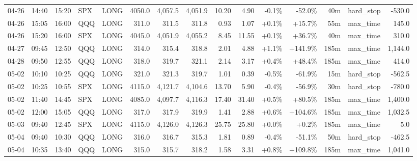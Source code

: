 \documentclass[11pt,a4paper,twoside]{article}
\begin{document}
\begin{landscape}
\begin{center}
\begin{longtable}{>{\color{txtmain}}l l l l l r r r r r r r r >{\color{txtmain}}l r}
04-26 & 14:40 & 15:20 & SPX & LONG & 4050.0 & 4,057.5 & 4,051.9 & 10.20 & 4.90 & \textcolor{lossred}{-0.1\%} & \textcolor{lossred}{-52.0\%} & 40m & hard\_stop & \textcolor{lossred}{-530.0} \\
04-26 & 15:05 & 16:00 & QQQ & LONG & 311.0 & 311.5 & 311.8 & 0.93 & 1.07 & \textcolor{wingreen}{+0.1\%} & \textcolor{wingreen}{+15.7\%} & 55m & max\_time & \textcolor{wingreen}{145.0} \\
04-26 & 15:20 & 16:00 & SPX & LONG & 4045.0 & 4,051.9 & 4,055.2 & 8.45 & 11.55 & \textcolor{wingreen}{+0.1\%} & \textcolor{wingreen}{+36.7\%} & 40m & max\_time & \textcolor{wingreen}{310.0} \\
04-27 & 09:45 & 12:50 & QQQ & LONG & 314.0 & 315.4 & 318.8 & 2.01 & 4.88 & \textcolor{wingreen}{+1.1\%} & \textcolor{wingreen}{+141.9\%} & 185m & max\_time & \textcolor{wingreen}{1,144.0} \\
04-28 & 09:50 & 12:55 & QQQ & LONG & 318.0 & 319.7 & 321.1 & 2.14 & 3.17 & \textcolor{wingreen}{+0.4\%} & \textcolor{wingreen}{+48.4\%} & 185m & max\_time & \textcolor{wingreen}{414.0} \\
05-02 & 10:10 & 10:25 & QQQ & LONG & 321.0 & 321.3 & 319.7 & 1.01 & 0.39 & \textcolor{lossred}{-0.5\%} & \textcolor{lossred}{-61.9\%} & 15m & hard\_stop & \textcolor{lossred}{-562.5} \\
05-02 & 10:25 & 10:55 & SPX & LONG & 4115.0 & 4,121.7 & 4,104.6 & 13.70 & 5.90 & \textcolor{lossred}{-0.4\%} & \textcolor{lossred}{-56.9\%} & 30m & hard\_stop & \textcolor{lossred}{-780.0} \\
05-02 & 11:40 & 14:45 & SPX & LONG & 4085.0 & 4,097.7 & 4,116.3 & 17.40 & 31.40 & \textcolor{wingreen}{+0.5\%} & \textcolor{wingreen}{+80.5\%} & 185m & max\_time & \textcolor{wingreen}{1,400.0} \\
05-02 & 12:00 & 15:05 & QQQ & LONG & 317.0 & 317.9 & 319.9 & 1.41 & 2.88 & \textcolor{wingreen}{+0.6\%} & \textcolor{wingreen}{+104.6\%} & 185m & max\_time & \textcolor{wingreen}{1,032.5} \\
05-03 & 09:40 & 12:45 & SPX & LONG & 4115.0 & 4,126.0 & 4,126.3 & 25.75 & 25.80 & \textcolor{wingreen}{+0.0\%} & \textcolor{wingreen}{+0.2\%} & 185m & max\_time & \textcolor{wingreen}{5.0} \\
05-04 & 09:40 & 10:30 & QQQ & LONG & 316.0 & 316.7 & 315.3 & 1.81 & 0.89 & \textcolor{lossred}{-0.4\%} & \textcolor{lossred}{-51.1\%} & 50m & hard\_stop & \textcolor{lossred}{-462.5} \\
05-04 & 10:35 & 13:40 & QQQ & LONG & 315.0 & 315.7 & 318.2 & 1.58 & 3.31 & \textcolor{wingreen}{+0.8\%} & \textcolor{wingreen}{+109.8\%} & 185m & max\_time & \textcolor{wingreen}{1,041.0} \\

\end{longtable}
\end{center}
\end{landscape}
\end{document}
